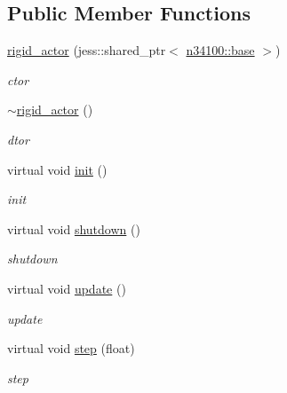 \subsection*{Public Member Functions}
\begin{DoxyCompactItemize}
\item 
\hyperlink{classnebula_1_1content_1_1actor_1_1physics_1_1rigid__actor_a81853ee942594a13d1cff5ffcc3ce28e}{rigid\_\-actor} (jess::shared\_\-ptr$<$ \hyperlink{classnebula_1_1content_1_1actor_1_1admin_1_1base}{n34100::base} $>$)
\begin{DoxyCompactList}\small\item\em ctor \item\end{DoxyCompactList}\item 
\hyperlink{classnebula_1_1content_1_1actor_1_1physics_1_1rigid__actor_af40b20343dc2657a5a02f61909a9b4b7}{$\sim$rigid\_\-actor} ()
\begin{DoxyCompactList}\small\item\em dtor \item\end{DoxyCompactList}\item 
virtual void \hyperlink{classnebula_1_1content_1_1actor_1_1physics_1_1rigid__actor_a9c4d9fe73271ad35a646c95fc12b4cde}{init} ()
\begin{DoxyCompactList}\small\item\em init \item\end{DoxyCompactList}\item 
virtual void \hyperlink{classnebula_1_1content_1_1actor_1_1physics_1_1rigid__actor_a19cfcb68b5be57574d96ffe856131aed}{shutdown} ()
\begin{DoxyCompactList}\small\item\em shutdown \item\end{DoxyCompactList}\item 
virtual void \hyperlink{classnebula_1_1content_1_1actor_1_1physics_1_1rigid__actor_a9227091110aae435ca13493edd27fe66}{update} ()
\begin{DoxyCompactList}\small\item\em update \item\end{DoxyCompactList}\item 
virtual void \hyperlink{classnebula_1_1content_1_1actor_1_1physics_1_1rigid__actor_a8d53c36044b639537cecff87ef9f84f1}{step} (float)
\begin{DoxyCompactList}\small\item\em step \item\end{DoxyCompactList}\item 

\end{DoxyCompactItemize}
